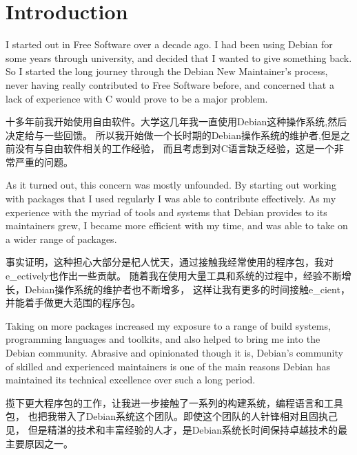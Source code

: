 

\section*{Introduction}
I started out in Free Software over a decade ago. I had been using Debian for
some years through university, and decided that I wanted to give something back.
So I started the long journey through the Debian New Maintainer's process, never
having really contributed to Free Software before, and concerned that a lack of
experience with C would prove to be a major problem.

十多年前我开始使用自由软件。大学这几年我一直使用Debian这种操作系统,然后决定给与一些回馈。
所以我开始做一个长时期的Debian操作系统的维护者,但是之前没有与自由软件相关的工作经验，
而且考虑到对C语言缺乏经验，这是一个非常严重的问题。 

As it turned out, this concern was mostly unfounded. By starting out working
with packages that I used regularly I was able to contribute effectively. As my
experience with the myriad of tools and systems that Debian provides to its
maintainers grew, I became more efficient with my time, and was able to take on
a wider range of packages. 

事实证明，这种担心大部分是杞人忧天，通过接触我经常使用的程序包，我对e_ectively也作出一些贡献。
随着我在使用大量工具和系统的过程中，经验不断增长，Debian操作系统的维护者也不断增多，
这样让我有更多的时间接触e_cient，并能着手做更大范围的程序包。

Taking on more packages increased my exposure to a range of build systems,
programming languages and toolkits, and also helped to bring me into the Debian
community. Abrasive and opinionated though it is, Debian's community of skilled
and experienced maintainers is one of the main reasons Debian has maintained its
technical excellence over such a long period.

揽下更大程序包的工作，让我进一步接触了一系列的构建系统，编程语言和工具包，
也把我带入了Debian系统这个团队。即使这个团队的人针锋相对且固执己见，
但是精湛的技术和丰富经验的人才，是Debian系统长时间保持卓越技术的最主要原因之一。

